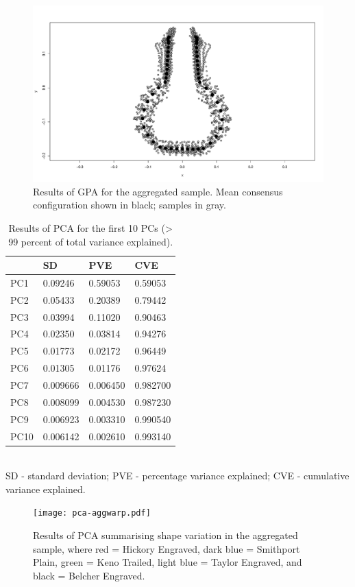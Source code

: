 \documentclass[review]{elsarticle}
\begin{document}
\begin{figure}[ht]\centering
\includegraphics[width=\linewidth]{gpaagg}
\caption{Results of GPA for the aggregated sample. Mean consensus configuration shown in black; samples in gray.}
\label{fig:gpaagg}
\end{figure}

\begin{table}[htbp]\centering
\footnotesize
\caption{Results of PCA for the first 10 PCs (> 99 percent of total variance explained).}
\centering
\begin{tabular}{lp{2cm}p{2cm}p{2cm}}
\toprule
 & SD & PVE & CVE\\
\midrule
PC1 & 0.09246 & 0.59053 & 0.59053\\
PC2 & 0.05433 & 0.20389 & 0.79442\\
PC3 & 0.03994 & 0.11020 & 0.90463\\
PC4 & 0.02350 & 0.03814 & 0.94276\\
PC5 & 0.01773 & 0.02172 & 0.96449\\
PC6 & 0.01305 & 0.01176 & 0.97624\\
PC7 & 0.009666 & 0.006450 & 0.982700\\
PC8 & 0.008099 & 0.004530 & 0.987230\\
PC9 & 0.006923 & 0.003310 & 0.990540\\
PC10 & 0.006142 & 0.002610 & 0.993140\\
\bottomrule
\end{tabular}
\smallskip\\
SD - standard deviation; PVE - percentage variance explained; CVE - cumulative variance explained.
\label{tab:Tblpca2}
\end{table}

\begin{figure}[ht]\centering
\texttt{[image: pca-aggwarp.pdf]}
\caption{Results of PCA summarising shape variation in the aggregated sample, where red = Hickory Engraved, dark blue = Smithport Plain, green = Keno Trailed, light blue = Taylor Engraved, and black = Belcher Engraved.}
\label{fig:FigPCA2}
\end{figure}
\end{document}
